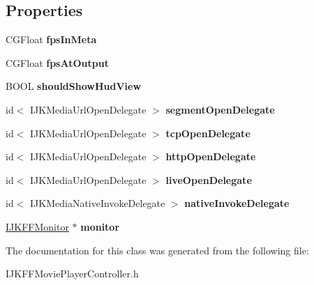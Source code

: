 \subsection*{Properties}
\begin{DoxyCompactItemize}
\item 
\mbox{\label{interface_i_j_k_f_f_movie_player_controller_a18679235448c8dcdf53923ff52f3996e}} 
C\+G\+Float {\bfseries fps\+In\+Meta}
\item 
\mbox{\label{interface_i_j_k_f_f_movie_player_controller_a0db0f235dcbd50f5c428d93da63102bc}} 
C\+G\+Float {\bfseries fps\+At\+Output}
\item 
\mbox{\label{interface_i_j_k_f_f_movie_player_controller_aed4abd7e53fabadb5248a03c25c2c6be}} 
B\+O\+OL {\bfseries should\+Show\+Hud\+View}
\item 
\mbox{\label{interface_i_j_k_f_f_movie_player_controller_ae942312fae31898819931f17dc5491f3}} 
id$<$ I\+J\+K\+Media\+Url\+Open\+Delegate $>$ {\bfseries segment\+Open\+Delegate}
\item 
\mbox{\label{interface_i_j_k_f_f_movie_player_controller_a3701717b554cdfb233ae8e003ee36d07}} 
id$<$ I\+J\+K\+Media\+Url\+Open\+Delegate $>$ {\bfseries tcp\+Open\+Delegate}
\item 
\mbox{\label{interface_i_j_k_f_f_movie_player_controller_a32d6776b77d5970a09874a66f6146c6c}} 
id$<$ I\+J\+K\+Media\+Url\+Open\+Delegate $>$ {\bfseries http\+Open\+Delegate}
\item 
\mbox{\label{interface_i_j_k_f_f_movie_player_controller_a96d29e713101b63831b64fe9a726415c}} 
id$<$ I\+J\+K\+Media\+Url\+Open\+Delegate $>$ {\bfseries live\+Open\+Delegate}
\item 
\mbox{\label{interface_i_j_k_f_f_movie_player_controller_aaf69dbfba1e393986ac9c90c538d93f5}} 
id$<$ I\+J\+K\+Media\+Native\+Invoke\+Delegate $>$ {\bfseries native\+Invoke\+Delegate}
\item 
\mbox{\label{interface_i_j_k_f_f_movie_player_controller_af0fbac64e185a393f2c329d28b8af939}} 
\hyperlink{interface_i_j_k_f_f_monitor}{I\+J\+K\+F\+F\+Monitor} $\ast$ {\bfseries monitor}
\end{DoxyCompactItemize}


The documentation for this class was generated from the following file\+:\begin{DoxyCompactItemize}
\item 
I\+J\+K\+F\+F\+Movie\+Player\+Controller.\+h\end{DoxyCompactItemize}
